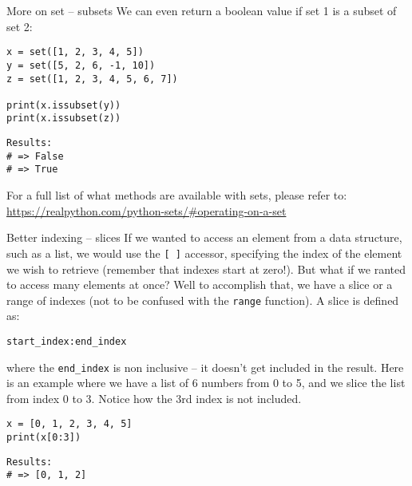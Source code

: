 \documentclass[10pt]{beamer}
\begin{document}
\begin{frame}[label={sec:org35d5d4d},fragile]{More on set -- subsets}
 We can even return a boolean value if set 1 is a subset of set 2:

\begin{verbatim}
x = set([1, 2, 3, 4, 5])
y = set([5, 2, 6, -1, 10])
z = set([1, 2, 3, 4, 5, 6, 7])

print(x.issubset(y))
print(x.issubset(z))
\end{verbatim}

\begin{verbatim}
Results: 
# => False
# => True
\end{verbatim}


For a full list of what methods are available with sets, please refer to: \url{https://realpython.com/python-sets/\#operating-on-a-set}
\end{frame}

\begin{frame}[label={sec:org2de9855},fragile]{Better indexing -- slices}
 If we wanted to access an element from a data structure, such as a list, we would use
the \texttt{[ ]} accessor, specifying the index of the element we wish to retrieve (remember
that indexes start at zero!). But what if we ranted to access many elements at once?
Well to accomplish that, we have a slice or a range of indexes (not to be confused
with the \texttt{range} function). A slice is defined as:

\begin{verbatim}
start_index:end_index
\end{verbatim}

where the \texttt{end\_index} is non inclusive -- it doesn't get included in the result. Here
is an example where we have a list of 6 numbers from 0 to 5, and we slice the list from index
0 to 3. Notice how the 3rd index is not included.

\begin{verbatim}
x = [0, 1, 2, 3, 4, 5]
print(x[0:3])
\end{verbatim}

\begin{verbatim}
Results: 
# => [0, 1, 2]
\end{verbatim}
\end{frame}
\end{document}
